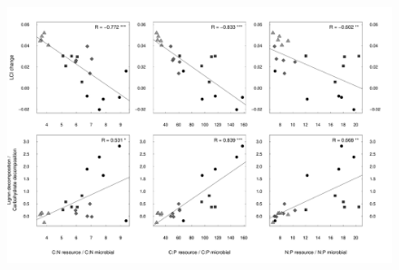 \documentclass[10pt]{article}
\begin{document}
\begin{flushleft}
\newpage
\begin{figure}[h!]
\vspace*{2mm}
\begin{center}
\includegraphics{ligpaper-graphcorr}
\end{center}
\end{figure}





\end{flushleft}
\end{document}
